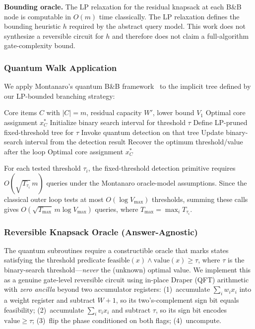 \documentclass[conference]{IEEEtran} \IEEEoverridecommandlockouts
\begin{document}
\textbf{Bounding oracle.} The LP relaxation for the residual knapsack at each B\&B node is computable in $O(m)$ time classically. The LP relaxation defines the bounding heuristic $h$ required by the abstract query model. This work does not synthesize a reversible circuit for $h$ and therefore does not claim a full-algorithm gate-complexity bound.

\subsubsection{Quantum Walk Application}

We apply Montanaro's quantum B\&B framework~\cite{ref24} to the implicit tree defined by our LP-bounded branching strategy:

\begin{algorithm}[h]
\caption{Classical Threshold-Search Outer Loop (Phase 2)}
\label{alg:qbb}
\begin{algorithmic}[1]
\REQUIRE Core items $C$ with $|C| = m$, residual capacity $W'$, lower bound $V_1$
\ENSURE Optimal core assignment $x^*_C$
\STATE Initialize binary search interval for threshold $\tau$
\STATE Define LP-pruned fixed-threshold tree for $\tau$
\STATE Invoke quantum detection on that tree
\STATE Update binary-search interval from the detection result
\ENDWHILE
\STATE Recover the optimum threshold/value after the loop
\RETURN Optimal core assignment $x^*_C$
\end{algorithmic}
\end{algorithm}

For each tested threshold $\tau_i$, the fixed-threshold detection primitive requires $O(\sqrt{T_{\tau_i}}\,m)$ queries under the Montanaro oracle-model assumptions. Since the classical outer loop tests at most $O(\log V_{\max})$ thresholds, summing these calls gives $O(\sqrt{T_{\max}}\,m\log V_{\max})$ queries, where $T_{\max}=\max_i T_{\tau_i}$.

\subsubsection{Reversible Knapsack Oracle (Answer-Agnostic)}
\label{sec:oracle-impl}

The quantum subroutines require a constructible oracle that marks states satisfying the threshold predicate $\text{feasible}(x) \wedge \text{value}(x) \geq \tau$, where $\tau$ is the binary-search threshold---\textit{never} the (unknown) optimal value. We implement this as a genuine gate-level reversible circuit using in-place Draper (QFT) arithmetic with \textit{zero ancilla} beyond two accumulator registers: (1)~accumulate $\sum_i w_i x_i$ into a weight register and subtract $W{+}1$, so its two's-complement sign bit equals feasibility; (2)~accumulate $\sum_i v_i x_i$ and subtract $\tau$, so its sign bit encodes $\text{value} \geq \tau$; (3)~flip the phase conditioned on both flags; (4)~uncompute. 
\end{document}
